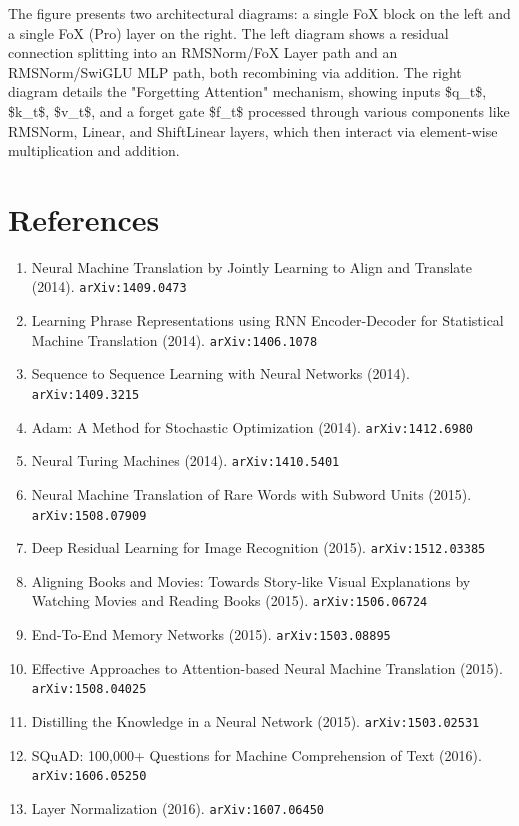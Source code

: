 \documentclass[11pt]{article}
\begin{document}
The figure presents two architectural diagrams: a single FoX block on the left and a single FoX (Pro) layer on the right. The left diagram shows a residual connection splitting into an RMSNorm/FoX Layer path and an RMSNorm/SwiGLU MLP path, both recombining via addition. The right diagram details the "Forgetting Attention" mechanism, showing inputs \$q\_t\$, \$k\_t\$, \$v\_t\$, and a forget gate \$f\_t\$ processed through various components like RMSNorm, Linear, and ShiftLinear layers, which then interact via element-wise multiplication and addition.

\section*{References}
\begin{enumerate}\small
  \item Neural Machine Translation by Jointly Learning to Align and Translate (2014). \texttt{arXiv:1409.0473}
  \item Learning Phrase Representations using RNN Encoder-Decoder for
  Statistical Machine Translation (2014). \texttt{arXiv:1406.1078}
  \item Sequence to Sequence Learning with Neural Networks (2014). \texttt{arXiv:1409.3215}
  \item Adam: A Method for Stochastic Optimization (2014). \texttt{arXiv:1412.6980}
  \item Neural Turing Machines (2014). \texttt{arXiv:1410.5401}
  \item Neural Machine Translation of Rare Words with Subword Units (2015). \texttt{arXiv:1508.07909}
  \item Deep Residual Learning for Image Recognition (2015). \texttt{arXiv:1512.03385}
  \item Aligning Books and Movies: Towards Story-like Visual Explanations by
  Watching Movies and Reading Books (2015). \texttt{arXiv:1506.06724}
  \item End-To-End Memory Networks (2015). \texttt{arXiv:1503.08895}
  \item Effective Approaches to Attention-based Neural Machine Translation (2015). \texttt{arXiv:1508.04025}
  \item Distilling the Knowledge in a Neural Network (2015). \texttt{arXiv:1503.02531}
  \item SQuAD: 100,000+ Questions for Machine Comprehension of Text (2016). \texttt{arXiv:1606.05250}
  \item Layer Normalization (2016). \texttt{arXiv:1607.06450}

\end{enumerate}
\end{document}
